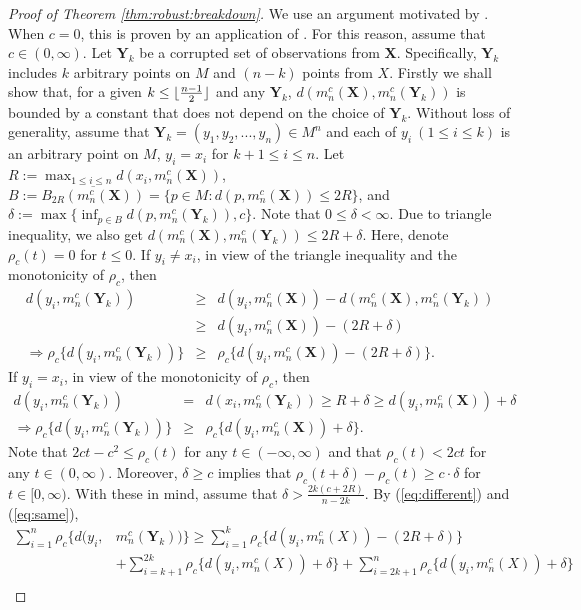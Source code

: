 \documentclass[preprint]{imsart}
\DeclarePairedDelimiter\floor{\lfloor}{\rfloor}
\newcommand{\bX}{\mathbf{X}}
\newcommand{\bY}{\mathbf{Y}}
\theoremstyle{plain}
\theoremstyle{remark}
\begin{document}
\begin{appendix}
\begin{proof}[Proof of Theorem \ref{thm:robust:breakdown}]
We use an argument motivated by \citep[Theorem 2.2,][]{lopuhaa1991breakdown}. When $c=0$, this is proven by an application of \citep[Theorem 2,][]{fletcher2009geometric}. For this reason, assume that $c \in (0, \infty)$. Let $\bY_{k}$ be a corrupted set of observations from $\bX$. Specifically, $\bY_{k}$ includes $k$ arbitrary points on $M$ and $(n-k)$ points from $X$. Firstly we shall show that, for a given $k \le \floor{\frac{n-1}{2}}$ and any $\bY_{k}$, $d(m^{c}_{n}(\bX), m^{c}_{n}(\bY_{k}))$ is bounded by a constant that does not depend on the choice of $\bY_{k}$. Without loss of generality, assume that $\bY_{k}=(y_1, y_2, ..., y_n)\in M^n$ and each of $y_i ~ (1 \le i \le k)$ is an arbitrary point on $M$, $y_i=x_i$ for $k+1 \le i \le n$. Let $R := \max_{1 \le i
\le n}d(x_{i}, m^{c}_{n}(\bX))$, $B:=\overline{B_{2R}(m_{n}^{c}(\bX))}=\{p \in M : d(p, m^{c}_{n}(\bX)) \le 2R \}$, and $\delta := \max\{\inf_{p \in B} d(p, m^{c}_{n}(\bY_{k})), c\}$. Note that $0 \le \delta < \infty$. Due to triangle inequality, we also get $d(m^{c}_{n}(\bX), m^{c}_{n}(\bY_k)) \le 2R + \delta$. Here, denote $\rho_{c}(t)=0$ for $t \le 0$. If $y_i \neq x_i$, in view of the triangle inequality and the monotonicity of $\rho_{c}$, then
\begin{eqnarray}\label{eq:different}
d(y_i, m^{c}_{n}(\bY_{k})) 
&\ge& d(y_i, m^{c}_{n}(\bX)) - d(m^{c}_{n}(\bX), m^{c}_{n}(\bY_k)) \nonumber \\ 
&\ge& d(y_i, m^{c}_{n}(\bX)) - (2R + \delta) \nonumber \\
\Rightarrow \rho_{c}\{d(y_i, m^{c}_{n}(\bY_{k}))\} & \ge & \rho_{c}\{d(y_i, m^{c}_{n}(\bX)) - (2R + \delta)\}.  
\end{eqnarray}
If $y_i = x_i$, in view of the monotonicity of $\rho_{c}$, then
\begin{eqnarray}\label{eq:same}
d(y_i, m^{c}_{n}(\bY_k)) 
& = & d(x_i, m^{c}_{n}(\bY_k)) \ge R + \delta \ge d(y_i, m^{c}_{n}(\bX)) + \delta \nonumber \\
\Rightarrow \rho_{c}\{d(y_i, m^{c}_{n}(\bY_k))\} 
& \ge & \rho_{c}\{d(y_i, m^{c}_{n}(\bX)) + \delta\}.  
\end{eqnarray}
Note that $2ct-c^2 \le \rho_{c}(t)$ for any $t\in (-\infty, \infty)$ and that $\rho_{c}(t) < 2ct$ for any $t \in (0, \infty)$. Moreover, $\delta \ge c$ implies that $\rho_{c}(t+\delta) - \rho_{c}(t) \ge c \cdot \delta$ for $t \in [0, \infty)$. With these in mind, assume that $\delta > \frac{2k(c+2R)}{n-2k}$. By (\ref{eq:different}) and (\ref{eq:same}),
\begin{align*}
\sum_{i=1}^{n}  \rho_{c}\{d(y_i,& m^{c}_{n}(\bY_k))\} \ge  \sum_{i=1}^{k} \rho_{c}\{d(y_i, m^{c}_{n}(X))-(2R+\delta)\}  \\ & + \sum_{i=k+1}^{2k} \rho_{c}\{d(y_i, m^{c}_{n}(X))+\delta\} + \sum_{i=2k+1}^{n} \rho_{c}\{d(y_i, m^{c}_{n}(X))+\delta\}  \\

\end{align*}
\end{proof}
\end{appendix}
\end{document}
